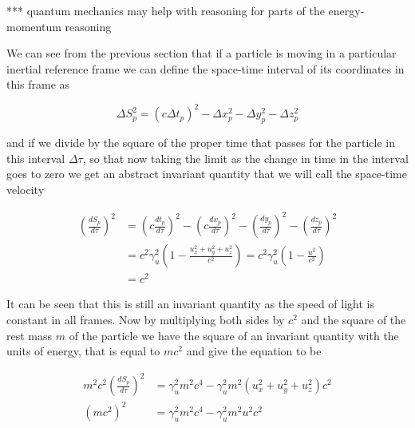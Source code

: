 *** quantum mechanics may help with reasoning for parts of the energy-momentum reasoning


We can see from the previous section that if a particle is moving in a particular inertial reference frame we can define the space-time interval of its coordinates in this frame as

\begin{equation}
	\Delta S_p^2 = (c\Delta t_p)^2 -\Delta x_p^2 -\Delta y_p^2 -\Delta z_p^2
\end{equation}

and if we divide by the square of the proper time that passes for the particle in this interval $\Delta\tau$, so that now taking the limit as the change in time in the interval goes to zero we get an abstract invariant quantity that we will call the space-time velocity

\begin{equation}
	\begin{aligned}
		\left(\frac{dS_p}{d\tau}\right)^2 & =  \left(c\frac{dt_p}{d\tau}\right)^2 - \left(c\frac{dx_p}{d\tau}\right)^2 - \left(\frac{dy_p}{d\tau}\right)^2 - \left(\frac{dz_p}{d\tau}\right)^2 \\
		                                  & = c^2\gamma_{u}^2 \left( 1 - \frac{u_x^2 + u_y^2 + u_z^2}{c^2} \right) = c^2\gamma_{u}^2 \left( 1 - \frac{u^2}{c^2} \right)                        \\
		                                  & = c^2
	\end{aligned}
\end{equation}

It can be seen that this is still an invariant quantity as the speed of light is constant in all frames. Now by multiplying both sides by $c^2$ and the square of the rest mass $m$ of the particle we have the square of an invariant quantity with the units of energy, that is equal to $mc^2$ and give the equation to be

\begin{equation}
	\label{eq: energy-momentum derivation}
	\begin{aligned}
		m^2 c^2 \left(\frac{dS_p}{d\tau}\right)^2 & =  \gamma_{u}^2 m^2 c^4 - \gamma_{u}^2 m^2 \left( u_x^2 + u_y^2 + u_z^2 \right) c^2 \\
		(mc^2)^2                                  & =  \gamma_{u}^2 m^2 c^4 - \gamma_{u}^2 m^2 u^2 c^2
	\end{aligned}
\end{equation}

